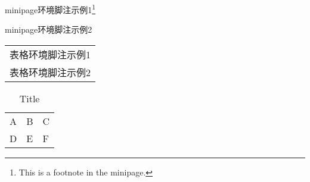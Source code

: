 \documentclass{ctexart}
\begin{document}
            \begin{minipage}{\linewidth}
                minipage环境脚注示例1\footnote{This is a footnote in the minipage.} %

                minipage环境脚注示例2\footnotemark %
            \end{minipage}

            \begin{tabular}{l}
                表格环境脚注示例1\footnotemark\\
                表格环境脚注示例2\footnotemark
            \end{tabular}
            


            \begin{table}
                \centering
                \caption{Title\protect\footnotemark}
                \begin{tabular}{l|l|l}
                    \hline
                    A&B&C\\
                    D&E&F\\
                    \hline
                \end{tabular}
            \end{table}
\end{document}

